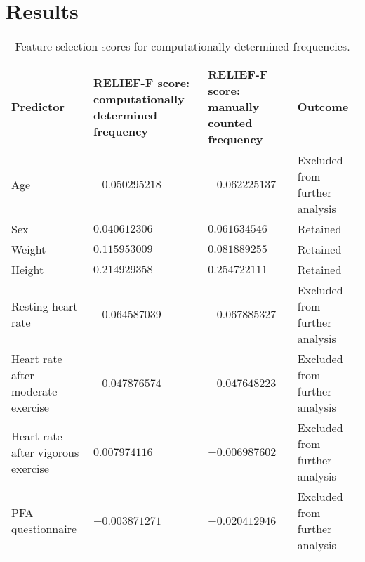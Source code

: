 \documentclass{article}
\begin{document}
\section{Results}
\begin{table}[]
\centering
	\begin{tabular}{@{}llll@{}}
	\toprule
	Predictor                          & RELIEF-F score: computationally determined frequency & RELIEF-F score: manually counted frequency & Outcome                        \\ \midrule
	Age                                & $-0.050295218$                                       & $-0.062225137$                             & Excluded from further analysis \\
	Sex                                & $0.040612306$                                        & $0.061634546$                              & Retained                       \\
	Weight                             & $0.115953009$                                        & $0.081889255$                              & Retained                       \\
	Height                             & $0.214929358$                                        & $0.254722111$                              & Retained                       \\
	Resting heart rate                 & $-0.064587039$                                       & $-0.067885327$                             & Excluded from further analysis \\
	Heart rate after moderate exercise & $-0.047876574$                                       & $-0.047648223$                             & Excluded from further analysis \\
	Heart rate after vigorous exercise & $0.007974116$                                        & $-0.006987602$                             & Excluded from further analysis \\
	PFA questionnaire                  & $-0.003871271$                                       & $-0.020412946$                             & Excluded from further analysis \\ 	\bottomrule
	\end{tabular}
	\caption{Feature selection scores for computationally determined frequencies.}
	\label{fig:relief}
\end{table}
\end{document}
